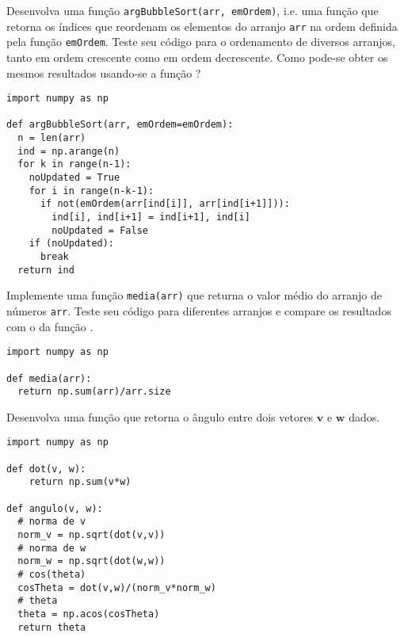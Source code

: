 \begin{exer}
  Desenvolva uma função \lstinline+argBubbleSort(arr, emOrdem)+, i.e. uma função que retorna os índices que reordenam os elementos do arranjo \lstinline+arr+ na ordem definida pela função \lstinline+emOrdem+. Teste seu código para o ordenamento de diversos arranjos, tanto em ordem crescente como em ordem decrescente. Como pode-se obter os mesmos resultados usando-se a função {\PYTHONnumpyDOTargsort}?
\end{exer}
\begin{resp}

\begin{lstlisting}
import numpy as np

def argBubbleSort(arr, emOrdem=emOrdem):
  n = len(arr)
  ind = np.arange(n)
  for k in range(n-1):
    noUpdated = True
    for i in range(n-k-1):
      if not(emOrdem(arr[ind[i]], arr[ind[i+1]])):
        ind[i], ind[i+1] = ind[i+1], ind[i]
        noUpdated = False
    if (noUpdated):
      break
  return ind
\end{lstlisting}

\end{resp}

\begin{exer}
  Implemente uma função \lstinline+media(arr)+ que returna o valor médio do arranjo de números \lstinline+arr+. Teste seu código para diferentes arranjos e compare os resultados com o da função {\PYTHONnumpyDOTmean}.
\end{exer}
\begin{resp}

\begin{lstlisting}
import numpy as np

def media(arr):
  return np.sum(arr)/arr.size
\end{lstlisting}

\end{resp}

\begin{exer}
  Desenvolva uma função que retorna o ângulo entre dois vetores $\pmb{v}$ e $\pmb{w}$ dados.
\end{exer}
\begin{resp}

\begin{lstlisting}
import numpy as np

def dot(v, w):
    return np.sum(v*w)

def angulo(v, w):
  # norma de v
  norm_v = np.sqrt(dot(v,v))
  # norma de w
  norm_w = np.sqrt(dot(w,w))
  # cos(theta)
  cosTheta = dot(v,w)/(norm_v*norm_w)
  # theta
  theta = np.acos(cosTheta)
  return theta
\end{lstlisting}

\end{resp}

